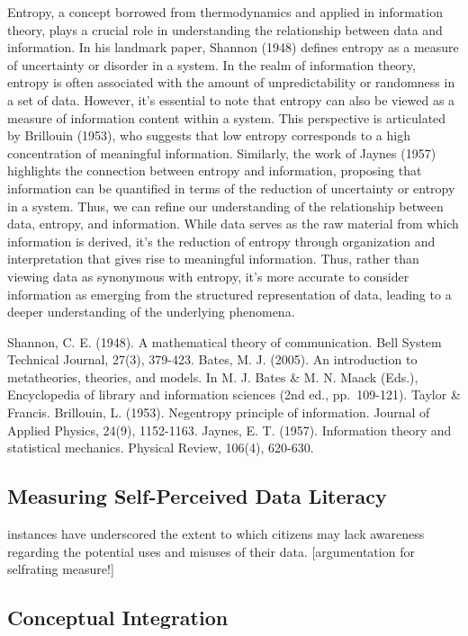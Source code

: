 \documentclass[
  12pt,
  a4paper,
  twoside]{article}
\begin{document}
Entropy, a concept borrowed from thermodynamics and applied in information theory, plays a crucial role in understanding the relationship between data and information. In his landmark paper, Shannon (1948) defines entropy as a measure of uncertainty or disorder in a system. In the realm of information theory, entropy is often associated with the amount of unpredictability or randomness in a set of data.
However, it's essential to note that entropy can also be viewed as a measure of information content within a system. This perspective is articulated by Brillouin (1953), who suggests that low entropy corresponds to a high concentration of meaningful information. Similarly, the work of Jaynes (1957) highlights the connection between entropy and information, proposing that information can be quantified in terms of the reduction of uncertainty or entropy in a system.
Thus, we can refine our understanding of the relationship between data, entropy, and information. While data serves as the raw material from which information is derived, it's the reduction of entropy through organization and interpretation that gives rise to meaningful information. Thus, rather than viewing data as synonymous with entropy, it's more accurate to consider information as emerging from the structured representation of data, leading to a deeper understanding of the underlying phenomena.

Shannon, C. E. (1948). A mathematical theory of communication. Bell System Technical Journal, 27(3), 379-423.
Bates, M. J. (2005). An introduction to metatheories, theories, and models. In M. J. Bates \& M. N. Maack (Eds.), Encyclopedia of library and information sciences (2nd ed., pp.~109-121). Taylor \& Francis.
Brillouin, L. (1953). Negentropy principle of information. Journal of Applied Physics, 24(9), 1152-1163.
Jaynes, E. T. (1957). Information theory and statistical mechanics. Physical Review, 106(4), 620-630.

\hypertarget{measuring-self-perceived-data-literacy}{%
\subsection{Measuring Self-Perceived Data Literacy}\label{measuring-self-perceived-data-literacy}}

instances have underscored the extent to which citizens may lack awareness regarding the potential uses and misuses of their data. {[}argumentation for selfrating measure!{]}

\hypertarget{conceptual-integration}{%
\subsection{Conceptual Integration}\label{conceptual-integration}}
\end{document}
